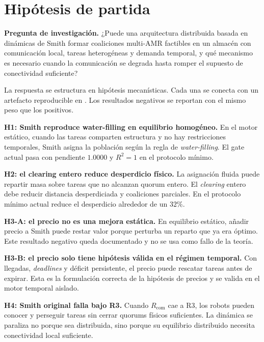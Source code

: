 \section{Hipótesis de partida}
\label{sec:hipotesis}

\textbf{Pregunta de investigación.}
¿Puede una arquitectura distribuida basada en dinámicas de Smith formar coaliciones
multi-AMR factibles en un almacén con comunicación local, tareas heterogéneas y demanda
temporal, y qué mecanismo es necesario cuando la comunicación se degrada hasta romper el
supuesto de conectividad suficiente?

La respuesta se estructura en hipótesis mecanísticas. Cada una se conecta con un
artefacto reproducible en . Los resultados negativos se
reportan con el mismo peso que los positivos.

\textbf{H1: Smith reproduce water-filling en equilibrio homogéneo.}
En el motor estático, cuando las tareas comparten estructura y no hay restricciones
temporales, Smith asigna la población según la regla de \emph{water-filling}. El gate
actual pasa con pendiente $1.0000$ y $R^2=1$ en el protocolo mínimo.

\textbf{H2: el clearing entero reduce desperdicio físico.}
La asignación fluida puede repartir masa sobre tareas que no alcanzan quorum entero. El
\emph{clearing} entero debe reducir distancia desperdiciada y coaliciones parciales. En
el protocolo mínimo actual reduce el desperdicio alrededor de un $32\%$.

\textbf{H3-A: el precio no es una mejora estática.}
En equilibrio estático, añadir precio a Smith puede restar valor porque perturba un
reparto que ya era óptimo. Este resultado negativo queda documentado y no se usa como
fallo de la teoría.

\textbf{H3-B: el precio solo tiene hipótesis válida en el régimen temporal.}
Con llegadas, \emph{deadlines} y déficit persistente, el precio puede rescatar tareas
antes de expirar. Esta es la formulación correcta de la hipótesis de precios y se valida
en el motor temporal aislado.

\textbf{H4: Smith original falla bajo R3.}
Cuando $R_{\mathrm{com}}$ cae a R3, los robots pueden conocer y perseguir tareas sin
cerrar quorums físicos suficientes. La dinámica se paraliza no porque sea distribuida,
sino porque su equilibrio distribuido necesita conectividad local suficiente.

